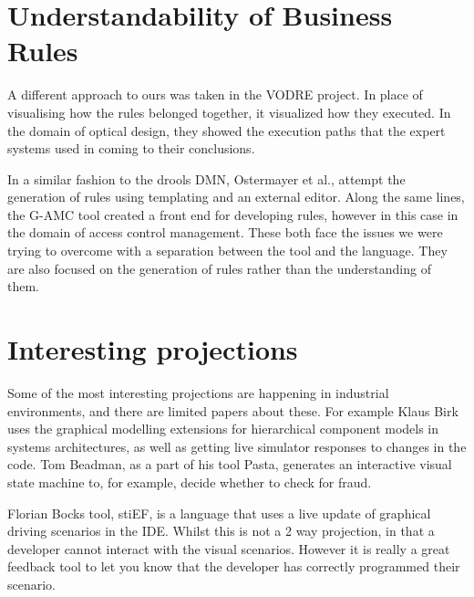 \section{Understandability of Business Rules}

A different approach to ours was taken in the VODRE project\cite{lapaev2014vodre}.
In place of visualising how the rules belonged together, it visualized how they executed.
In the domain of optical design, they showed the execution paths that the expert systems used in coming to their conclusions.

In a similar fashion to the drools DMN, Ostermayer et al.\cite{ostermayer2013simplifying}, attempt the generation of rules using templating and an external editor.
Along the same lines, the G-AMC tool\cite{sa2016g} created a front end for developing rules, however in this case in the domain of access control management.
These both face the issues we were trying to overcome with a separation between the tool and the language. 
They are also focused on the generation of rules rather than the understanding of them.

\section{Interesting projections}
Some of the most interesting projections are happening in industrial environments, and there are limited papers about these.
For example Klaus Birk\cite{Birken_Interactive} uses the graphical modelling extensions for hierarchical component models in systems architectures, as well as getting live simulator responses to changes in the code.
Tom Beadman\cite{Beadman_Journey}, as a part of his tool Pasta, generates an interactive visual state machine to, for example, decide whether to check for fraud. 

Florian Bocks tool, stiEF\cite{Bock_stief}, is a language that uses a live update of graphical driving scenarios in the IDE.
Whilst this is not a 2 way projection, in that a developer cannot interact with the visual scenarios.
However it is really a great feedback tool to let you know that the developer has correctly programmed their scenario. 